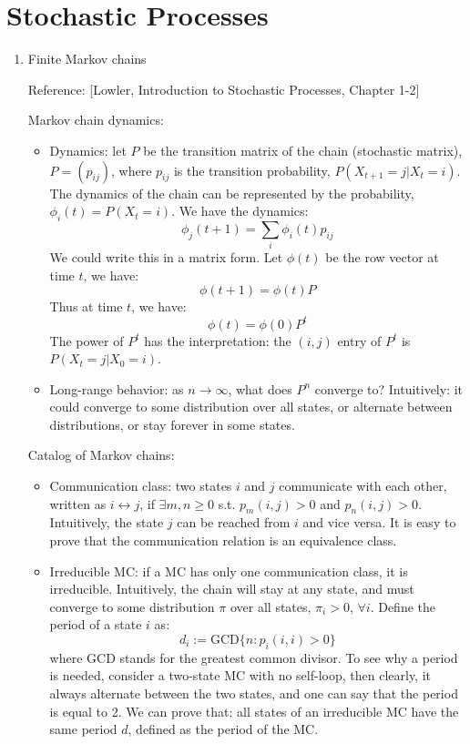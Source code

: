 \documentclass{report}
\begin{document}
\section{Stochastic Processes}
\begin{enumerate}

\item{Finite Markov chains}

Reference: [Lowler, Introduction to Stochastic Processes, Chapter 1-2]

Markov chain dynamics: 
\begin{itemize}
\item Dynamics: let $P$ be the transition matrix of the chain (stochastic matrix), $P=(p_{ij})$, where $p_{ij}$ is the transition probability, $P(X_{t+1} = j|X_t = i)$. The dynamics of the chain can be represented by the probability, $\phi_i(t) = P(X_t = i)$. We have the dynamics: 
\begin{equation}
\phi_j(t+1) = \sum_i \phi_i(t) p_{ij}	
\end{equation}
We could write this in a matrix form. Let $\phi(t)$ be the row vector at time $t$, we have: 
\begin{equation}
\phi(t+1) = \phi(t) P
\end{equation}
Thus at time $t$, we have: 
\begin{equation}
\phi(t) = \phi(0) P^t	
\end{equation}
The power of $P^t$ has the interpretation: the $(i,j)$ entry of $P^t$ is $P(X_t = j|X_0 = i)$. 

\item Long-range behavior: as $n \to \infty$, what does $P^n$ converge to? Intuitively: it could converge to some distribution over all states, or alternate between distributions, or stay forever in some states. 
\end{itemize}

Catalog of Markov chains: 
\begin{itemize}
\item Communication class: two states $i$ and $j$ communicate with each other, written as $i \leftrightarrow j$, if $\exists m, n \geq 0$ s.t. $p_m(i,j) > 0$ and $p_n(i,j) > 0$. Intuitively, the state $j$ can be reached from $i$ and vice versa. It is easy to prove that the communication relation is an equivalence class. 

\item Irreducible MC: if a MC has only one communication class, it is irreducible. Intuitively, the chain will stay at any state, and must converge to some distribution $\pi$ over all states, $\pi_i > 0$, $\forall i$. Define the period of a state $i$ as: 
\begin{equation}
d_i := \text{GCD}\{n: p_i(i,i)>0\}	
\end{equation}
where GCD stands for the greatest common divisor. To see why a period is needed, consider a two-state MC with no self-loop, then clearly, it always alternate between the two states, and one can say that the period is equal to 2. We can prove that: all states of an irreducible MC have the same period $d$, defined as the period of the MC. 


\end{itemize}
\end{enumerate}
\end{document}
